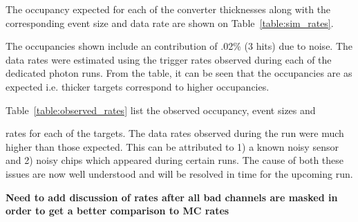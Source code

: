 The occupancy expected for each of the converter thicknesses along with the 
corresponding event size and data rate are shown on Table~\ref{table:sim_rates}.
\begin{table}[h]
    \caption{Occupancy, event size and resulting data rate expected for each of the three 
             converter thicknesses used in the test run.}
    \label{table:sim_rates}
\end{table}
The occupancies shown include an contribution of .02\% (3 hits) due to noise.  
The data rates were estimated using the trigger rates observed during each
of the dedicated photon runs. From the table, it can be seen that the 
occupancies are as expected i.e. thicker targets correspond to higher 
occupancies. 

Table~\ref{table:observed_rates} list the observed occupancy, event sizes and 
\begin{table}[h]
    \caption{Occupancy, event size and resulting data rate observed for each of the three 
             converter thicknesses used in the test run.}
    \label{table:observed_rates}
\end{table}    
rates for each of the targets.  The data rates observed during the run were
much higher than those expected.  This can be attributed to 1) a known
noisy sensor and 2) noisy chips which appeared during certain runs.  The cause
of both these issues are now well understood and will be resolved in time 
for the upcoming run.

\begin{center}
    \textbf{Need to add discussion of rates after all bad channels are masked
            in order to get a better comparison to MC rates}
\end{center}
